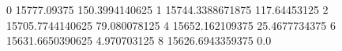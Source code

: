 0 15777.09375 150.3994140625
1 15744.3388671875 117.64453125
2 15705.7744140625 79.080078125
4 15652.162109375 25.4677734375
6 15631.6650390625 4.970703125
8 15626.6943359375 0.0
